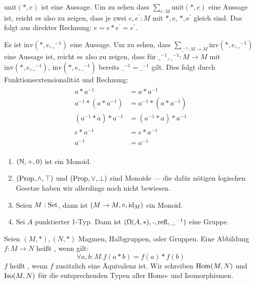 \begin{beweis}
  $\mathrm{unit}(\ast,e)$ ist eine Aussage. Um zu sehen dass  $\sum_{e:M}\mathrm{unit}(\ast,e)$ eine Aussage ist, reicht es also zu zeigen, dass je zwei $e,e^\prime:M$ mit $\mathrm{\ast,e}$, $\mathrm{\ast,e^\prime}$ gleich sind. Das folgt aus direkter Rechnung: $e=e\ast e^\prime =e^\prime$.

  Es ist $\mathrm{inv}(\ast,e,\_^{-1})$ eine Aussage.
  Um zu sehen, dass $\sum_{\_^{-1}:M\to M}\mathrm{inv}(\ast,e,\_^{-1})$ eine Aussage ist, reicht es also zu zeigen, dass für $\_^{-1},\_^{\overline{-1}}:M\to M$ mit $\mathrm{inv}(\ast,e,\_^{-1})$, $\mathrm{inv}(\ast,e,\_^{\overline{-1}})$ bereits $\_^{-1}=\_^{\overline{-1}}$ gilt.
  Dies folgt durch Funktionsextensionalität und Rechnung:
  \begin{align*}
    a\ast a^{-1} &= a\ast a^{\overline{-1}} \\
    a^{-1}\ast (a\ast a^{-1}) &= a^{-1}\ast (a\ast a^{\overline{-1}}) \\
    (a^{-1}\ast a)\ast a^{-1} &= (a^{-1}\ast a)\ast a^{\overline{-1}} \\
    e\ast a^{-1} &= e\ast a^{\overline{-1}} \\
     a^{-1} &= a^{\overline{-1}} \\
  \end{align*}
\end{beweis}

\begin{beispiel}
  \begin{enumerate}
  \item $(\mathbb{N},+,0)$ ist ein Monoid.
  \item $(\mathrm{Prop},\wedge,\top)$ und $(\mathrm{Prop},\vee,\bot)$ sind Monoide --- die dafür nötigen logischen Gesetze haben wir allerdings noch nicht bewiesen.
  \item Seien $M:\mathrm{Set}$, dann ist $(M\to M, \circ,\mathrm{id}_M)$ ein Monoid.
  \item Sei $A$ punktierter 1-Typ. Dann ist $(\Omega(A,\ast),\kon,\refl,\_^{-1})$ eine Gruppe.
  \end{enumerate}
\end{beispiel}

\begin{definition}
  Seien $(M,\ast),(N,\ast)$ Magmen, Halbgruppen, oder Gruppen.
  Eine Abbildung $f:M\to N$ heißt , wenn gilt:
  \[
    \forall a,b:M.f(a\ast b) =f(a)\ast f(b)
    \]
    $f$ heißt , wenn $f$ zusätzlich eine Äquivalenz ist.
    Wir schreiben $\mathrm{Hom}(M,N)$ und $\mathrm{Iso}(M,N)$\index{$\Hom$}\index{$\Iso$} für die entsprechenden Typen aller Homo- und Isomorphismen.
\end{definition}

